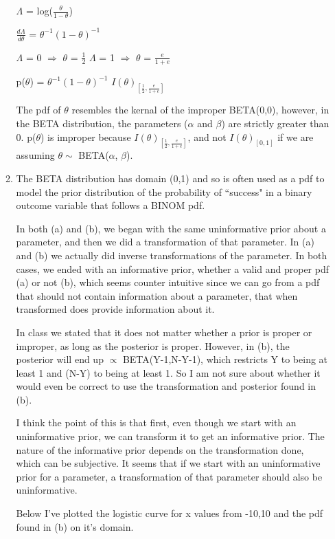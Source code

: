 \documentclass{article}\usepackage[]{graphicx}\usepackage[]{color}
\begin{document}
\begin{enumerate}
\begin{enumerate}
$\Lambda$ = log($\frac{\theta}{1-\theta}$)

$\frac{d\Lambda}{d\theta}$ = $\theta^{-1}(1-\theta)^{-1}$ 

$\Lambda$ = 0 $\Rightarrow$ $\theta$ = $\frac{1}{2}$
$\Lambda$ = 1 $\Rightarrow$ $\theta$ = $\frac{e}{1+e}$

p($\theta$) = $\theta^{-1}(1-\theta)^{-1}$ \dot $I(\theta)_{[\frac{1}{2}, \frac{e}{1+e}]}$

The pdf of $\theta$ resembles the kernal of the improper BETA(0,0), however, in the BETA distribution, the parameters ($\alpha$ and $\beta$) are strictly greater than 0. p($\theta$) is improper because $I(\theta)_{[\frac{1}{2}, \frac{e}{1+e}]}$, and not $I(\theta)_{[0,1]}$ if we are assuming $\theta \sim$ BETA($\alpha$, $\beta$).


\item%


The BETA distribution has domain (0,1) and so is often used as a pdf to model the prior distribution of the probability of ``success" in a binary outcome variable that follows a BINOM pdf.

In both (a) and (b), we began with the same uninformative prior about a parameter, and then we did a transformation of that parameter. In (a) and (b) we actually did inverse transformations of the parameter. In both cases, we ended with an informative prior, whether a valid and proper pdf (a) or not (b), which seems counter intuitive since we can go from a pdf that should not contain information about a parameter, that when transformed does provide information about it.

In class we stated that it does not matter whether a prior is proper or improper, as long as the posterior is proper. However, in (b), the posterior will end up $\propto$ BETA(Y-1,N-Y-1), which restricts Y to being at least 1 and (N-Y) to being at least 1. So I am not sure about whether it would even be correct to use the transformation and posterior found in (b).  

I think the point of this is that first, even though we start with an uninformative prior, we can transform it to get an informative prior. The nature of the informative prior depends on the transformation done, which can be subjective. It seems that if we start with an uninformative prior for a parameter, a transformation of that parameter should also be uninformative. 

Below I've plotted the logistic curve for x values from -10,10 and the pdf found in (b) on it's domain.


\end{enumerate}
\end{enumerate}
\end{document}
